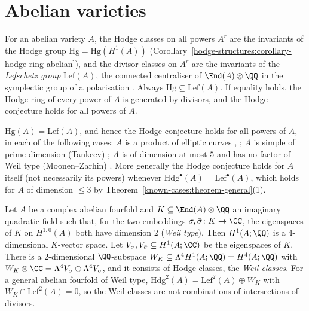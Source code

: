 \section{Abelian varieties}\label{known-cases:section-abelian}

\begin{remark}\label{known-cases:remark-abelian-mechanism}
For an abelian variety $A$, the Hodge classes on all powers $A^r$ are the invariants of the Hodge group $\mathrm{Hg} = \mathrm{Hg}(H^1(A))$ (Corollary~\ref{hodge-structures:corollary-hodge-ring-abelian}),
and the divisor classes on $A^r$ are the invariants of the \emph{Lefschetz group} $\mathrm{Lef}(A)$, the connected centraliser of $\End(A) \otimes \QQ$ in the symplectic group of a polarisation
\cite{murty-1984}. Always $\mathrm{Hg} \subseteq \mathrm{Lef}(A)$. If equality holds, the Hodge ring of every power of $A$ is generated by divisors, and the Hodge conjecture holds for all powers of $A$.
\end{remark}

\begin{theorem}\label{known-cases:theorem-abelian-known}
$\mathrm{Hg}(A) = \mathrm{Lef}(A)$, and hence the Hodge conjecture holds for all powers of $A$, in each of the following cases: $A$ is a product of elliptic curves \cite{imai-1976},
\cite{murty-1984}; $A$ is simple of prime dimension (Tankeev) \cite{tankeev-1982}; $A$ is of dimension at most $5$ and has no factor of Weil type (Moonen--Zarhin) \cite{moonen-zarhin-1999}. More
generally the Hodge conjecture holds for $A$ itself (not necessarily its powers) whenever $\mathrm{Hdg}^\bullet(A) = \mathrm{Lef}^\bullet(A)$, which holds for $A$ of dimension $\leq 3$ by
Theorem~\ref{known-cases:theorem-general}(1).
\end{theorem}

\begin{proposition}\label{known-cases:proposition-weil-classes}
Let $A$ be a complex abelian fourfold and $K \subseteq \End(A) \otimes \QQ$ an imaginary quadratic field such that, for the two embeddings $\sigma, \bar\sigma \colon K \to \CC$, the eigenspaces of $K$
on $H^{1,0}(A)$ both have dimension $2$ (\emph{Weil type}). Then $H^1(A; \QQ)$ is a $4$-dimensional $K$-vector space. Let $V_\sigma, V_{\bar\sigma} \subseteq H^1(A; \CC)$ be the eigenspaces of $K$.
There is a $2$-dimensional $\QQ$-subspace $W_K \subseteq \Lambda^4H^1(A; \QQ) = H^4(A; \QQ)$ with $W_K \otimes \CC = \Lambda^4V_\sigma \oplus \Lambda^4V_{\bar\sigma}$, and it consists of Hodge classes, the
\emph{Weil classes}. For a general abelian fourfold of Weil type, $\mathrm{Hdg}^2(A) = \mathrm{Lef}^2(A) \oplus W_K$ with $W_K \cap \mathrm{Lef}^2(A) = 0$, so the Weil classes are
not combinations of intersections of divisors.
\end{proposition}

